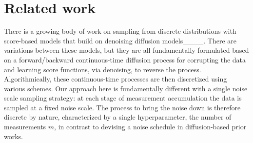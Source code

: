 \section{Related work}
There is a growing body of work on sampling from discrete distributions with score-based models that build on denoising diffusion models____.     There are variations between these models, but they are all fundamentally formulated based on a forward/backward continuous-time diffusion process for corrupting the data and learning score functions, via denoising, to reverse the process. Algorithmically, these continuous-time processes are then discretized using various schemes.  Our approach here is fundamentally different with a single noise scale sampling strategy: at each stage of measurement accumulation the data is sampled at a fixed noise scale. The process to bring the noise down is therefore discrete by nature, characterized by a single hyperparameter, the number of measurements $m$, in contrast to devising a noise schedule in diffusion-based prior works.